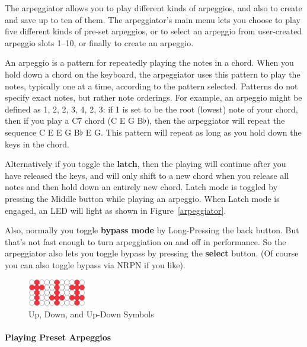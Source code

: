 \documentclass{article}
\begin{document}
The arpeggiator allows you to play different kinds of arpeggios, and also to create and save up to ten of them.  The arpeggiator's main menu lets you choose to play five different kinds of pre-set arpeggios, or to select an arpeggio from user-created arpeggio slots 1--10, or finally to create an arpeggio.

An arpeggio is a pattern for repeatedly playing the notes in a chord.  When you hold down a chord on the keyboard, the arpeggiator uses this pattern to play the notes, typically one at a time, according to the pattern selected.  Patterns do not specify exact notes, but rather note orderings.  For example, an arpeggio might be defined as 1, 2, 2, 3, 4, 2, 3: if 1 is set to be the root (lowest) note of your chord, then if you play a C7 chord (C E G B$\flat$), then the arpeggiator will repeat the sequence C E E G B$\flat$ E G.  This pattern will repeat as long as you hold down the keys in the chord.  

Alternatively if you toggle the {\bf latch}, then the playing will continue after you have released the keys, and will only shift to a new chord when you release all notes and then hold down an entirely new chord.  Latch mode is toggled by pressing the Middle button while playing an arpeggio.  When Latch mode is engaged, an LED will light as shown in Figure~\ref{arpeggiator}.

Also, normally you toggle {\bf bypass mode} by Long-Pressing the back button.  But that's not fast enough to turn arpeggiation on and off in performance.  So the arpeggiator also lets you toggle bypass by pressing the {\bf select} button.  (Of course you can also toggle bypass via NRPN if you like). 

\begin{figure}
\begin{center}
\vspace{-4em}\includegraphics[width=1in]{updown}
\vspace{-1em}
\caption{\small Up, Down, and Up-Down Symbols}
\vspace{-3em}
\end{center}
\end{figure}


\paragraph{Playing Preset Arpeggios}
\end{document}
